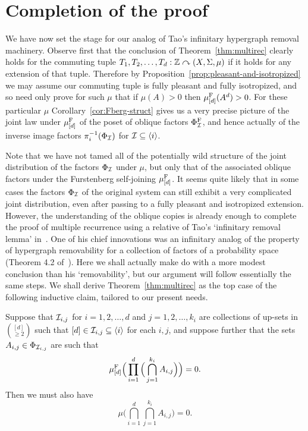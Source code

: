 \documentclass[12pt]{article}
\begin{document}
\section{Completion of the proof}

We have now set the stage for our analog of Tao's infinitary
hypergraph removal machinery.  Observe first that the conclusion of
Theorem~\ref{thm:multirec} clearly holds for the commuting tuple
$T_1,T_2,\ldots,T_d:\bbZ\curvearrowright (X,\S,\mu)$ if it holds for
any extension of that tuple.  Therefore by
Proposition~\ref{prop:pleasant-and-isotropized} we may assume our
commuting tuple is fully pleasant and fully isotropized, and so need
only prove for such $\mu$ that if $\mu (A)
> 0$ then $\mu^{\rm{F}}_{[d]}(A^d) > 0$. For these
particular $\mu$ Corollary~\ref{cor:Fberg-struct} gives us a very
precise picture of the joint law under $\mu^{\rm{F}}_{[d]}$ of the
poset of oblique factors $\Phi^{\rm{F}}_{\I}$, and hence actually of
the inverse image factors $\pi_i^{-1}(\Phi_{\I})$ for $\I\subseteq
\langle i\rangle$.

Note that we have not tamed all of the potentially wild structure of
the joint distribution of the factors $\Phi_\cal{I}$ under $\mu$,
but only that of the associated oblique factors under the
Furstenberg self-joining $\mu^{\rm{F}}_{[d]}$. It seems quite likely
that in some cases the factors $\Phi_\I$ of the original system can
still exhibit a very complicated joint distribution, even after
passing to a fully pleasant and isotropized extension. However, the
understanding of the oblique copies is already enough to complete
the proof of multiple recurrence using a relative of Tao's
`infinitary removal lemma' in~\cite{Tao07}. One of his chief
innovations was an infinitary analog of the property of hypergraph
removability for a collection of factors of a probability space
(Theorem 4.2 of~\cite{Tao07}). Here we shall actually make do with a
more modest conclusion than his `removability', but our argument
will follow essentially the same steps. We shall derive
Theorem~\ref{thm:multirec} as the top case of the following
inductive claim, tailored to our present needs.

\begin{prop}\label{prop:infremoval}
Suppose that $\I_{i,j}$ for $i=1,2,\ldots,d$ and $j =
1,2,\ldots,k_i$ are collections of up-sets in $\binom{[d]}{\geq 2}$
such that $[d] \in \I_{i,j} \subseteq \langle i\rangle$ for each
$i,j$, and suppose further that the sets $A_{i,j}\in
\Phi_{\I_{i,j}}$ are such that
\[\mu^{\rm{F}}_{[d]}\Big(\prod_{i=1}^d\Big(\bigcap_{j=1}^{k_i}A_{i,j}\Big)\Big) = 0.\]
Then we must also have
\[\mu\Big(\bigcap_{i=1}^d\bigcap_{j=1}^{k_i}A_{i,j}\Big) = 0.\]
\end{prop}
\end{document}
